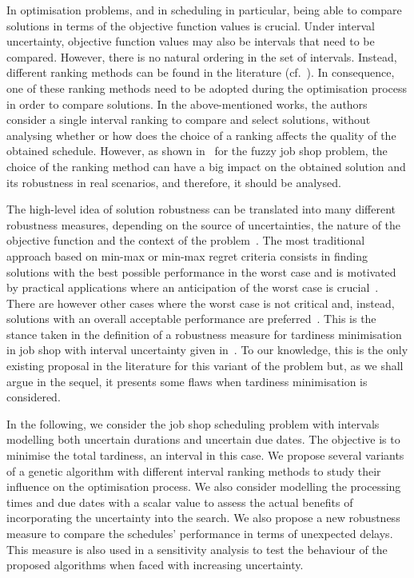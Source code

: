\documentclass[12pt,halfline,a4paper]{ouparticle}
\begin{document}
In optimisation problems, and in scheduling in particular, being able to compare solutions in terms of the objective function values is crucial.  Under interval uncertainty, objective function values may also be intervals that need to be compared. However, there is no natural ordering in the set of intervals. Instead, different ranking methods can be found in the literature (cf.~\cite{Bustince2013,Karmakar2012}). In consequence,  one of these ranking methods need to be adopted during the optimisation process in order to compare solutions. In the above-mentioned works, the authors consider a single interval ranking to compare and select solutions, without analysing whether or how does the choice of a ranking affects the quality of the obtained schedule. However, as shown in~\cite{Palacios2015b} for the fuzzy job shop problem, the choice of the ranking method can have a big impact on the obtained solution and its robustness in real scenarios, and therefore, it should be analysed.

The high-level idea of solution robustness can be translated into many different robustness measures, depending on the source of uncertainties, the nature of the objective function and the context of the problem~\cite{Aytung2005, Roy2010}.  The most traditional approach based on min-max or min-max regret criteria consists in finding solutions with the best possible performance in the worst case and is motivated by practical applications where an anticipation of the worst case is crucial~\cite{Aissi2009}.  There are however other cases where the worst case is not critical and, instead, solutions with an overall acceptable performance are preferred~\cite{Kalai2012}. This is the stance taken in the definition of a robustness measure for tardiness minimisation in job shop with interval uncertainty given in~\cite{Diaz2020}. To our knowledge, this is the only existing proposal in the literature for this variant of the problem but, as we shall argue in the sequel, it presents some flaws when tardiness minimisation is considered.

In the following, we consider the job shop scheduling problem with intervals modelling both uncertain durations and uncertain due dates. The objective is to minimise the total tardiness, an interval in this case. We propose several variants of a genetic algorithm with different interval ranking methods to study their influence on the optimisation process. We also consider modelling the processing times and due dates with a scalar value to assess the actual benefits of incorporating the uncertainty into the search. We also propose a new robustness measure to compare the schedules' performance in terms of unexpected delays. This measure is also used in a sensitivity analysis to test the behaviour of the proposed algorithms when faced with increasing uncertainty.
\end{document}
